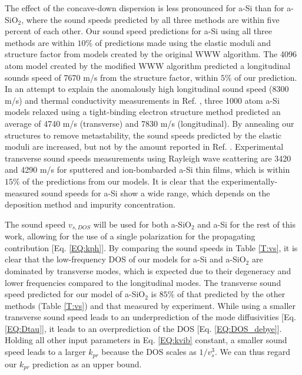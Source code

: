 \documentclass[aps,prb,twocolumn,superscriptaddress,footinbib,amsmath,amssymb,floatfix]{revtex4}
\begin{document}
The effect of the concave-down dispersion
is less pronounced for a-Si than for a-SiO$_2$, where the sound speeds 
predicted by all three methods are within five percent of each other. 
Our sound speed predictions for a-Si using all three methods
are within $10\%$ of predictions made using the elastic moduli
\cite{kluge_elastic_1988,feldman_elastic_1991} 
and structure factor\cite{feldman_calculations_2002} 
from models created by the original WWW algorithm.
\cite{wooten_computer_1985} 
The 4096 atom model created by the modified WWW algorithm 
\cite{barkema_high-quality_2000} predicted a longitudinal sounds 
speed of 7670 m/s from the structure factor,
\cite{christie_vibrational_2007} within $5\%$ of our prediction. 
In an attempt to explain the 
anomalously high longitudinal sound speed (8300 m/s) and 
thermal conductivity measurements in Ref. , 
three 1000 atom a-Si models relaxed using a tight-binding electron 
structure method predicted an average of 4740 m/s (transverse) and 
7830 m/s (longitudinal).\cite{liu_high_2009} By annealing our 
structures to remove metastability, 
the sound speeds predicted by the elastic moduli are increased, but 
not by the amount reported in Ref. . 
Experimental transverse sound speeds measurements using Rayleigh wave 
scattering are 3420 and 4290 m/s for sputtered 
and ion-bombarded a-Si thin films,\cite{vacher_attenuation_1980} which 
is within $15\%$ of the predictions from our models. 
It is clear that the experimentally-measured sound speeds for a-Si 
show a wide range, which depends on the deposition method and impurity 
concentration.
\cite{vacher_attenuation_1980,liu_high_2009,yang_anomalously_2010}

The sound speed $v_{s,DOS}$ will be used for both 
a-SiO$_2$ and a-Si for the rest of this work, allowing 
for the use of a single polarization for the propagating 
contribution [Eq. \eqref{EQ:kph}]. 
By comparing the sound speeds in Table \ref{T:vs}, it is clear that 
the low-frequency DOS of our models for a-Si and a-SiO$_2$ are 
dominated by 
transverse modes, which is expected due to their degeneracy and lower 
frequencies compared to the longitudinal modes.  
The transverse sound speed predicted for our model of 
a-SiO$_2$ is $85\%$ of that predicted by 
the other methods (Table \ref{T:vs}) and that measured by experiment.
\cite{ruocco_high-frequency_2001,polian_elastic_2002,
ruzicka_evidence_2004} 
While using a smaller transverse sound speed 
leads to an underprediction of the
mode diffusivities [Eq. \eqref{EQ:Dtau}], it leads to an
overprediction of the DOS [Eq. \eqref{EQ:DOS_debye}]. 
Holding all other input parameters in Eq. \eqref{EQ:kvib} constant,
a smaller sound speed leads to a larger $k_{pr}$ 
because the DOS scales as $1/v^3_{s}$. We can thus regard
our $k­_{pr}$ prediction as an upper bound.
\end{document}
